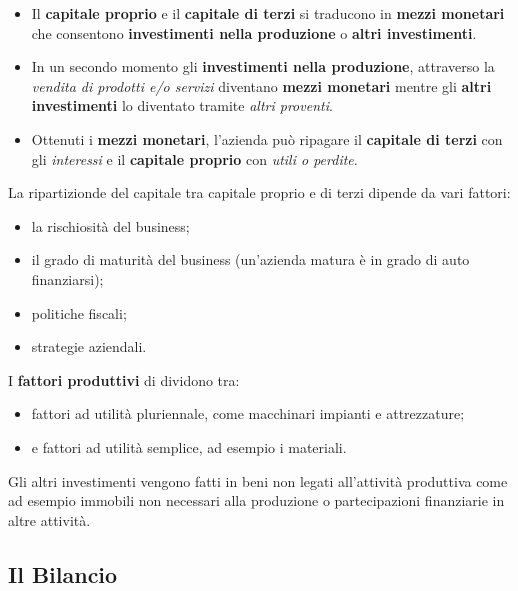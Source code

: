 \documentclass[a4paper,portrait,12pt]{article}
\theoremstyle{definition}
\begin{document}
\begin{itemize}
\item Il \textbf{capitale proprio} e il \textbf{capitale di terzi} si traducono in \textbf{mezzi monetari} che consentono \textbf{investimenti nella produzione} o \textbf{altri investimenti}.
\item In un secondo momento gli \textbf{investimenti nella produzione}, attraverso la \emph{vendita di prodotti e/o servizi} diventano \textbf{mezzi monetari} mentre gli \textbf{altri investimenti} lo diventato tramite \emph{altri proventi}.
\item Ottenuti i \textbf{mezzi monetari}, l'azienda può ripagare il \textbf{capitale di terzi} con gli \emph{interessi} e il \textbf{capitale proprio} con \emph{utili o perdite}. 
\end{itemize}

La ripartizionde del capitale tra capitale proprio e di terzi dipende da vari fattori:
\begin{itemize}
\item la rischiosità del business;
\item il grado di maturità del business (un'azienda matura è in grado di auto finanziarsi);
\item politiche fiscali;
\item strategie aziendali.
\end{itemize}

I \textbf{fattori produttivi} di dividono tra:
\begin{itemize}
\item fattori ad utilità pluriennale, come macchinari impianti e attrezzature;
\item e fattori ad utilità semplice, ad esempio i materiali.
\end{itemize}

Gli altri investimenti vengono fatti in beni non legati all'attività produttiva come ad esempio immobili non necessari alla produzione o partecipazioni finanziarie in altre attività.\\

\subsection{Il Bilancio}
\end{document}
